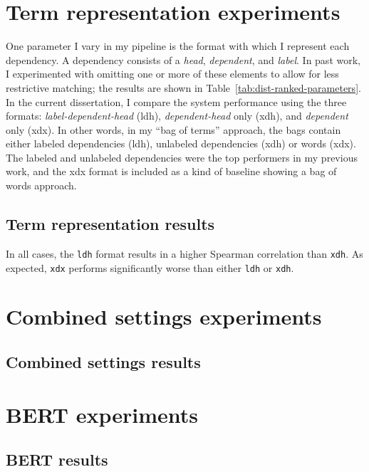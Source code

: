 \section{Term representation experiments}
\label{sec:exp-term-reps}
One parameter I vary in my pipeline is the format with which I represent each dependency. A dependency consists of a \textit{head}, \textit{dependent}, and \textit{label}. In past work, I experimented with omitting one or more of these elements to allow for less restrictive matching; the results are shown in Table~\ref{tab:dist-ranked-parameters}. In the current dissertation, I compare the system performance using the three formats: \textit{label-dependent-head} (ldh), \textit{dependent-head} only (xdh), and \textit{dependent} only (xdx). In other words, in my ``bag of terms'' approach, the bags contain either labeled dependencies (ldh), unlabeled dependencies (xdh) or words (xdx). The labeled and unlabeled dependencies were the top performers in my previous work, and the xdx format is included as a kind of baseline showing a bag of words approach.

\subsection{Term representation results}
\label{sec:term-norm-results}
In all cases, the \texttt{ldh} format results in a higher Spearman correlation than \texttt{xdh}. As expected, \texttt{xdx} performs significantly worse than either \texttt{ldh} or \texttt{xdh}.


\section{Combined settings experiments}
\label{sec:exp-combos}
\subsection{Combined settings results}
\label{sec:combos-results}

\section{BERT experiments}
\label{sec:exp-bert}
\subsection{BERT results}
\label{sec:bert-results}
